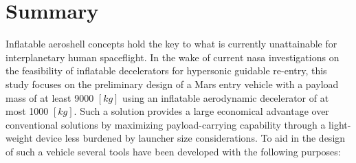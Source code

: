 \section*{Summary}\label{cha:summary}
Inflatable aeroshell concepts hold the key to what is currently unattainable for interplanetary human spaceflight. In the wake of current \acrshort{nasa} investigations on the feasibility of inflatable decelerators for hypersonic guidable re-entry, this study focuses on the preliminary design of a Mars entry vehicle with a payload mass of at least 9000 $\left[kg\right]$ using an inflatable aerodynamic decelerator of at most 1000 $\left[kg\right]$. Such a solution provides a large economical advantage over conventional solutions by maximizing payload-carrying capability through a light-weight device less burdened by launcher size considerations.
\newline
\newline
To aid in the design of such a vehicle several tools have been developed with the following purposes:

